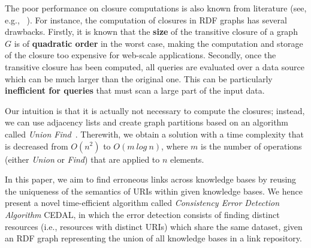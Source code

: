 The poor performance on closure computations is also known from literature (see, e.g., ~\cite{arenas2008extension}). For instance, the computation of closures in RDF graphs has several drawbacks. Firstly, it is known that the \textbf{size} of the transitive closure of a graph $G$ is of \textbf{quadratic order} in the worst case, making the computation and storage of the closure too expensive for web-scale applications. Secondly, once the transitive closure has been computed, all queries are evaluated over a data source which can be much larger than the original one. This can be particularly \textbf{inefficient for queries} that must scan a large part of the input data.

Our intuition is that it is actually not necessary to compute the closures; instead, we can use adjacency lists and create graph partitions based on an algorithm called \emph{Union Find}~\cite{Tarjan:1975:EGB:321879.321884}. Therewith, we obtain a solution with a time complexity that is decreased from $O(n^2)$ to $O(m~log~n)$, where $m$ is the number of operations (either \emph{Union} or \emph{Find}) that are applied to $n$ elements.

In this paper, we aim to find erroneous links across knowledge bases by reusing the uniqueness of the semantics of URIs within given knowledge bases. We hence present a novel time-efficient algorithm called \textit{Consistency Error Detection Algorithm} \ac{CEDAL}, in which the error detection consists of finding distinct resources (i.e., resources with distinct URIs) which share the same dataset, given an RDF graph representing the union of all knowledge bases in a link repository.

